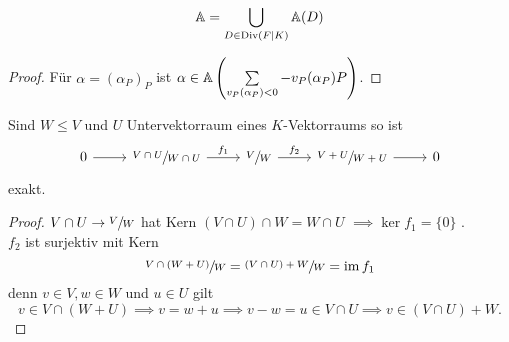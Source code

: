 \begin{lemma}
    $$ \mathbb{A} = \bigcup\limits_{D \in \operatorname{Div}(F|K)}\mathbb{A}(D) $$
\end{lemma}
\begin{proof}
    Für $\alpha = (\alpha_P)_P$ ist $\alpha \in \mathbb{A}\left(\sum\limits_{v_P(\alpha_P)<0}-v_P(\alpha_P)P\right)$.
\end{proof}

\begin{lemma}
    Sind $W \leq V$ und $U$ Untervektorraum eines $K$-Vektorraums so ist
    $$\begin{tikzcd}
        0 \ar[r] &\sfrac{V\cap U}{W \cap U} \ar[r, "f_1"] & \sfrac{V}{W} \ar[r, "f_2"] & \sfrac{V + U}{W +U} \ar[r] & 0
    \end{tikzcd}$$
    exakt.
\end{lemma}
\begin{proof}
    $ V \cap U \to \sfrac{V}{W}$ hat Kern $(V \cap U) \cap W = W \cap U$ $\implies \ker f_1 = \{0\}$ .\\
    $ f_2$ ist surjektiv mit Kern 
    $$ \sfrac{V \cap (W+U)}{W} = \sfrac{(V \cap U) +W}{W} = \operatorname{im} f_1$$
    denn $v \in V,w \in W$ und $u \in U$ gilt
    $$ v \in V \cap (W+U) \implies v=w+u \implies v - w = u \in V \cap U \implies v \in (V \cap U) + W.$$
\end{proof}

